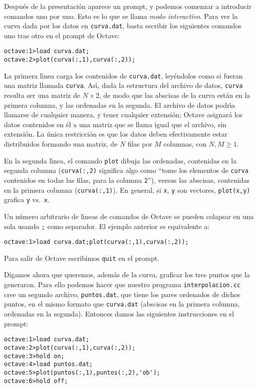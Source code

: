 \documentclass[12pt]{article}
\begin{document}
Despu\'es de la presentaci\'on aparece un prompt, y podemos comenzar a
introducir comandos uno por uno. Esto es lo que se llama {\it modo
  interactivo}. Para ver la curva dada por los datos en
\verb+curva.dat+, basta escribir los siguientes comandos uno tras otro
en el prompt de Octave:
\begin{verbatim}
octave:1>load curva.dat;
octave:2>plot(curva(:,1),curva(:,2));
\end{verbatim}

La primera l\'{\i}nea carga los contenidos de \verb+curva.dat+,
ley\'endolos como si fueran una matriz llamada \verb+curva+.
As\'{\i}, dada la estructura del archivo de datos, \verb+curva+
resulta ser una matriz de $N\times2$, de modo que las  abscisas
de la curva est\'an en la primera columna, y las ordenadas en la
segunda. El archivo de datos podr\'{\i}a llamarse de cualquier manera,
y tener cualquier extensi\'on; Octave asignar\'a los datos contenidos
en \'el a una matriz que se llama igual que el archivo, sin
extensi\'on. La \'unica restricci\'on es que los datos deben
efectivamente estar distribuidos formando una matriz, de $N$ filas por
$M$ columnas, con $N,M\geq1$. 

En la segunda l\'{\i}nea, el comando \verb+plot+ dibuja las ordenadas,
contenidas en la segunda columna (\verb+curva(:,2)+ significa algo
como ``tome los elementos de \verb+curva+ contenidos en todas las
filas, para la columna \verb+2+''), versus las abscisas, contenidas en
la primera columna (\verb+curva(:,1)+). En general, si \verb+x+,
\verb+y+ son vectores, \verb+plot(x,y)+ grafica \verb+y+ vs.\
\verb+x+. 

Un n\'umero arbitrario de l\'{\i}neas de comandos de Octave se pueden
colapsar en una sola usando \verb+;+ como separador. El ejemplo
anterior es equivalente a:
\begin{verbatim}
octave:1>load curva.dat;plot(curva(:,1),curva(:,2));
\end{verbatim}


Para salir de Octave escribimos \verb+quit+ en el prompt.

\vspace{.3cm}

Digamos ahora que queremos, adem\'as de la curva, graficar los tres
puntos que la generaron. Para ello podemos hacer que nuestro programa
\verb+interpolacion.cc+ cree un segundo archivo, \verb+puntos.dat+,
que tiene los pares ordenados de dichos puntos, en el mismo formato
que \verb+curva.dat+ (abscisas en la primera columna, ordenadas en la
segunda). Entonces damos las siguientes instrucciones en el prompt:
\begin{verbatim}
octave:1>load curva.dat;
octave:2>plot(curva(:,1),curva(:,2));
octave:3>hold on;
octave:4>load puntos.dat;
octave:5>plot(puntos(:,1),puntos(:,2),'ob');
octave:6>hold off;
\end{verbatim}
\end{document}
